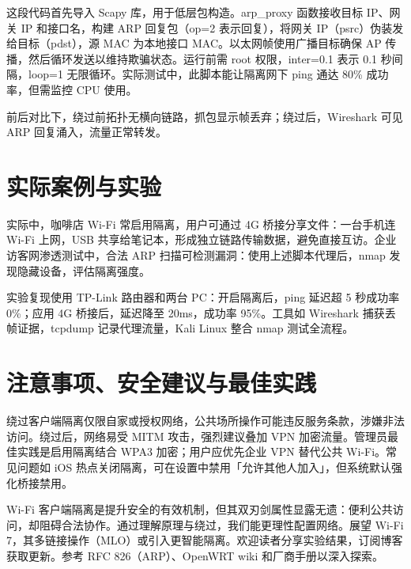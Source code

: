 这段代码首先导入 Scapy 库，用于低层包构造。arp\_{}proxy 函数接收目标 IP、网关 IP 和接口名，构建 ARP 回复包（op=2 表示回复），将网关 IP（psrc）伪装发给目标（pdst），源 MAC 为本地接口 MAC。以太网帧使用广播目标确保 AP 传播，然后循环发送以维持欺骗状态。运行前需 root 权限，inter=0.1 表示 0.1 秒间隔，loop=1 无限循环。实际测试中，此脚本能让隔离网下 ping 通达 80\%{} 成功率，但需监控 CPU 使用。\par
前后对比下，绕过前拓扑无横向链路，抓包显示帧丢弃；绕过后，Wireshark 可见 ARP 回复涌入，流量正常转发。\par
\chapter{实际案例与实验}
实际中，咖啡店 Wi-Fi 常启用隔离，用户可通过 4G 桥接分享文件：一台手机连 Wi-Fi 上网，USB 共享给笔记本，形成独立链路传输数据，避免直接互访。企业访客网渗透测试中，合法 ARP 扫描可检测漏洞：使用上述脚本代理后，nmap 发现隐藏设备，评估隔离强度。\par
实验复现使用 TP-Link 路由器和两台 PC：开启隔离后，ping 延迟超 5 秒成功率 0\%{}；应用 4G 桥接后，延迟降至 20ms，成功率 95\%{}。工具如 Wireshark 捕获丢帧证据，tcpdump 记录代理流量，Kali Linux 整合 nmap 测试全流程。\par
\chapter{注意事项、安全建议与最佳实践}
绕过客户端隔离仅限自家或授权网络，公共场所操作可能违反服务条款，涉嫌非法访问。绕过后，网络易受 MITM 攻击，强烈建议叠加 VPN 加密流量。管理员最佳实践是启用隔离结合 WPA3 加密；用户应优先企业 VPN 替代公共 Wi-Fi。常见问题如 iOS 热点关闭隔离，可在设置中禁用「允许其他人加入」，但系统默认强化桥接禁用。\par
Wi-Fi 客户端隔离是提升安全的有效机制，但其双刃剑属性显露无遗：便利公共访问，却阻碍合法协作。通过理解原理与绕过，我们能更理性配置网络。展望 Wi-Fi 7，其多链接操作（MLO）或引入更智能隔离。欢迎读者分享实验结果，订阅博客获取更新。参考 RFC 826（ARP）、OpenWRT wiki 和厂商手册以深入探索。\par
